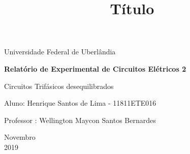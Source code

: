 \documentclass[a4paper, 12pt]{article}
\begin{document}
	\begin{titlepage}
		\begin{center}
			
			
			\Huge{Universidade Federal de Uberlândia}\\
			\vspace{15pt}
			
			\vspace{85pt}
			
			\textbf{\LARGE{Relatório de Experimental de Circuitos Elétricos 2}}
			\title{\large{Título}}
			
		\end{center}
		\vspace{1,5cm}
		
		\begin{flushright}
			\begin{list}{}{
				\setlength{\leftmargin}{4.5cm}
				\setlength{\rightmargin}{0cm}
				\setlength{\labelwidth}{0pt}
				\setlength{\labelsep}{\leftmargin}}
				
				\item
				Circuitos Trifásicos desequilibrados
				\begin{list}{}{
					\setlength{\leftmargin}{0cm}
					\setlength{\rightmargin}{0cm}
					\setlength{\labelwidth}{0pt}
					\setlength{\labelsep}{\leftmargin}}
					\item Aluno:  Henrique Santos de Lima - 11811ETE016\
					\item Professor : Wellington Maycon Santos Bernardes\
				\end{list}
			\end{list}
		\end{flushright}
		\vspace{1cm}
		\begin{center}
			\vspace{\fill}
			Novembro\\
			2019
		\end{center}
	\end{titlepage}
	
	\tableofcontents
	
	\thispagestyle{empty}
	
	\newpage
\end{document}
